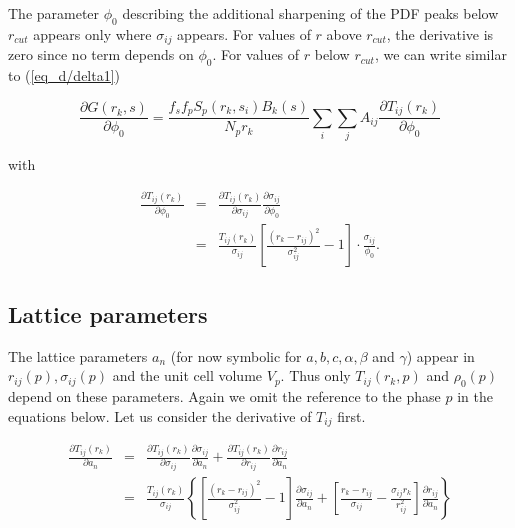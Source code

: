 The parameter $\phi_{0}$ describing the additional sharpening of the
PDF peaks below $r_{cut}$ appears only where $\sigma_{ij}$ appears.
For values of $r$ above $r_{cut}$, the derivative is zero since no
term depends on $\phi_{0}$. For values of $r$ below $r_{cut}$, we
can write similar to (\ref{eq_d/delta1})

\begin{equation}
  \frac{\partial G(r_{k},s)}{\partial \phi_{0}} =
    \frac{f_{s}f_{p} S_{p}(r_{k},s_{i}) B_{k}(s)}{N_{p}r_{k}} \sum_{i} \sum_{j}
    A_{ij} \frac{\partial T_{ij}(r_{k})}{\partial \phi_{0}}
  \label{eq_d/rat1}
\end{equation}

\noindent
with

\begin{eqnarray}
  \frac{\partial T_{ij}(r_{k})}{\partial \phi_{0}} & = &
    \frac{\partial T_{ij}(r_{k})}{\partial \sigma_{ij}}
    \frac{\partial \sigma_{ij}} {\partial \phi_{0}} \nonumber \\
  & = & \frac{T_{ij}(r_{k})}{\sigma_{ij}}
    \left [ \frac{(r_{k} - r_{ij})^{2}}{\sigma_{ij}^{2}} - 1 \right ] \cdot
    \frac{\sigma_{ij}}{\phi_{0}}.
  \label{eq_d/rat2}
\end{eqnarray}


\subsection*{Lattice parameters}

The lattice parameters $a_{n}$ (for now symbolic for $a, b, c, \alpha,
\beta$ and $\gamma$) appear in $r_{ij}(p), \sigma_{ij}(p)$ and
the unit cell volume $V_{p}$. Thus only $T_{ij}(r_{k},p)$ and
$\rho_{0}(p)$ depend on these parameters. Again we omit the reference
to the phase $p$ in the equations below. Let us consider the
derivative of $T_{ij}$ first.

\begin{eqnarray}
  \frac{\partial T_{ij}(r_{k})}{\partial a_{n}} & = &
     \frac{\partial T_{ij}(r_{k})}{\partial \sigma_{ij}}
     \frac{\partial \sigma_{ij}} {\partial a_{n}} +
     \frac{\partial T_{ij}(r_{k})}{\partial r_{ij}}
     \frac{\partial r_{ij}}      {\partial a_{n}} \nonumber \\
  & = & \frac{T_{ij}(r_{k})}{\sigma_{ij}} \left \{ \left [
     \frac{(r_{k} - r_{ij})^{2}}{\sigma_{ij}^{2}} - 1 \right ]
     \frac{\partial \sigma_{ij}} {\partial a_{n}} +
     \left [ \frac{r_{k} - r_{ij}}{\sigma_{ij}}
     - \frac{\sigma_{ij} r_{k}}{r^{2}_{ij}}    \right ]
     \frac{\partial r_{ij}}{\partial a_{n}} \right \}
  \label{eq_d/da1}
\end{eqnarray}

